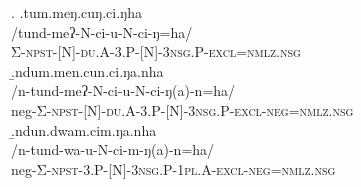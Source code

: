 \ex. \a.\glll tum.meŋ.cuŋ.ci.ŋha\\
/tund-meʔ-N-ci-u-N-ci-ŋ=ha/\\
		Σ\textsc{-npst-[N]-du.A-3.P-[N]-3nsg.P-excl=nmlz.nsg}\\
	\b.\glll ndum.men.cun.ci.ŋa.nha\\
	/n-tund-meʔ-N-ci-u-N-ci-ŋ(a)-n=ha/\\
		{\sc neg-}Σ\textsc{-npst-[N]-du.A-3.P-[N]-3nsg.P-excl-neg=nmlz.nsg}\\
	\b.\glll ndun.dwam.cim.ŋa.nha\\
	/n-tund-wa-u-N-ci-m-ŋ(a)-n=ha/\\
		{\sc neg-}Σ\textsc{-npst-3.P-[N]-3nsg.P-1pl.A-excl-neg=nmlz.nsg}\\
		



